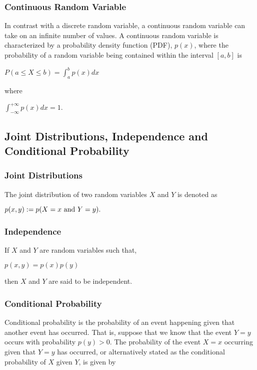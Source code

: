\documentclass[twoside]{article}
\begin{document}
\subsubsection{Continuous Random Variable}

In contrast with a discrete random variable, a continuous random variable can take on an infinite number of values. A continuous random variable is characterized by a probability density function (PDF), $p(x)$, where the probability of a random variable being contained within the interval $[a,b]$ is
\begin{center}
$P(a \leq X \leq b) = \int_{a}^{b}p(x)dx$
\end{center}
where
\begin{center}
$\int_{-\infty}^{+\infty}p(x)dx=1$.
\end{center}

\subsection{Joint Distributions, Independence and Conditional Probability}

\subsubsection{Joint Distributions}

The joint distribution of two random variables $X$ and $Y$ is denoted as \begin{center}
$p(x,y):=p(X=x\ \textnormal{and}\ Y=y).$
\end{center}

\subsubsection{Independence}

If $X$ and $Y$ are random variables such that,
\begin{center}
$p(x,y)=p(x)p(y)$
\end{center}
then $X$ and $Y$ are said to be independent.

\subsubsection{Conditional Probability}

Conditional probability is the probability of an event happening given that another event has occurred. That is, suppose that we know that the event $Y = y$ occurs with probability $p(y) > 0$. The probability of the event $X=x$ occurring given that $Y=y$ has occurred, or alternatively stated as the conditional probability of $X$ given $Y$, is given by
\end{document}
